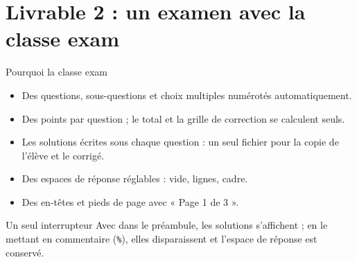 \section{Livrable 2 : un examen avec la classe exam}

\begin{frame}{Pourquoi la classe exam}
  \small
  \begin{itemize}
    \item Des questions, sous-questions et choix multiples numérotés
      automatiquement.
    \item Des points par question ; le total et la grille de correction se
      calculent seuls.
    \item Les solutions écrites sous chaque question : un seul fichier pour
      la copie de l'élève et le corrigé.
    \item Des espaces de réponse réglables : vide, lignes, cadre.
    \item Des en-têtes et pieds de page avec « Page 1 de 3 ».
  \end{itemize}
  \vspace{4pt}
  \begin{Rem}{Un seul interrupteur}
    \small Avec  dans le préambule, les solutions
    s'affichent ; en le mettant en commentaire (\texttt{\%}), elles
    disparaissent et l'espace de réponse est conservé.
  \end{Rem}
\end{frame}

